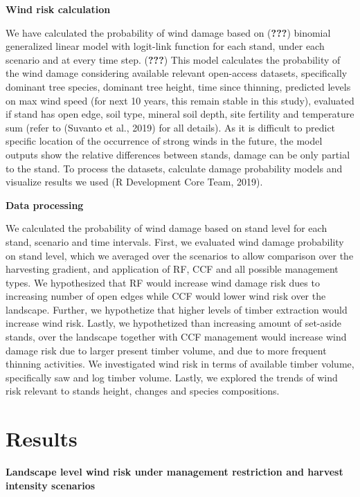 \documentclass[]{elsarticle} %
\begin{document}
\textbf{Wind risk calculation}

We have calculated the probability of wind damage based on
({\textbf{???}}) binomial generalized linear model with logit-link
function for each stand, under each scenario and at every time step.
({\textbf{???}}) This model calculates the probability of the wind
damage considering available relevant open-access datasets, specifically
dominant tree species, dominant tree height, time since thinning,
predicted levels on max wind speed (for next 10 years, this remain
stable in this study), evaluated if stand has open edge, soil type,
mineral soil depth, site fertility and temperature sum (refer to
(Suvanto et al., 2019) for all details). As it is difficult to predict
specific location of the occurrence of strong winds in the future, the
model outputs show the relative differences between stands, damage can
be only partial to the stand. To process the datasets, calculate damage
probability models and visualize results we used (R Development Core
Team, 2019).

\textbf{Data processing}

We calculated the probability of wind damage based on stand level for
each stand, scenario and time intervals. First, we evaluated wind damage
probability on stand level, which we averaged over the scenarios to
allow comparison over the harvesting gradient, and application of RF,
CCF and all possible management types. We hypothesized that RF would
increase wind damage risk dues to increasing number of open edges while
CCF would lower wind risk over the landscape. Further, we hypothetize
that higher levels of timber extraction would increase wind risk.
Lastly, we hypothetized than increasing amount of set-aside stands, over
the landscape together with CCF management would increase wind damage
risk due to larger present timber volume, and due to more frequent
thinning activities. We investigated wind risk in terms of available
timber volume, specifically saw and log timber volume. Lastly, we
explored the trends of wind risk relevant to stands height, changes and
species compositions.

\section{Results}\label{results}

\textbf{Landscape level wind risk under management restriction and
harvest intensity scenarios}
\end{document}
